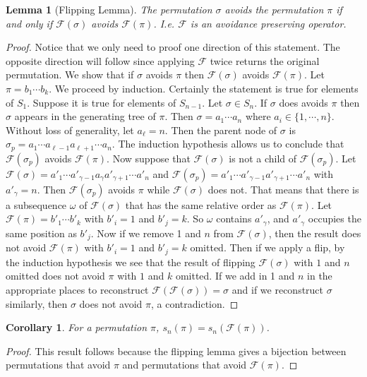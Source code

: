 \documentclass[11pt,letterpaper,twoside,english]{article}
\theoremstyle{theorem}
\newtheorem{corollary}[theorem]{Corollary}
\newtheorem{lemma}[theorem]{Lemma}
\theoremstyle{remark}
\begin{document}
\begin{lemma}[Flipping Lemma]
The permutation $\sigma$ avoids the permutation $\pi$ if and only if $\mathcal{F}(\sigma)$ avoids $\mathcal{F}(\pi)$. I.e. $\mathcal{F}$ is an avoidance preserving operator. 
\end{lemma}
\begin{proof}
Notice that we only need to proof one direction of this statement. The opposite direction will follow since applying $\mathcal{F}$ twice returns the original permutation. We show that if ${\sigma}$ avoids $\pi$ then $\mathcal{F}(\sigma)$ avoids $\mathcal{F}(\pi)$. Let $\pi=b_1\cdots b_k$. We proceed by induction. Certainly the statement is true for elements of $S_1$. Suppose it is true for elements of $S_{n-1}$. Let $\sigma\in S_n$. If ${\sigma}$ does avoids $\pi$ then $\sigma$ appears in the generating tree of $\pi$.  Then $\sigma=a_1\cdots a_n$ where $a_i\in\{1,\cdots, n\}$. Without loss of generality, let $a_\ell=n$. Then the parent node of $\sigma$ is $\sigma_p=a_1\cdots a_{\ell-1} a_{\ell+1}\cdots a_n$. The induction hypothesis allows us to conclude that $\mathcal{F}(\sigma_p)$ avoids $\mathcal{F}(\pi)$. Now suppose that $\mathcal{F}(\sigma)$ is not a child of $\mathcal{F}(\sigma_p)$. Let $\mathcal{F}(\sigma)=a'_1\cdots a'_{\gamma-1} a_{\gamma}a'_{\gamma+1}\cdots a'_n$ and $\mathcal{F}(\sigma_p)=a'_1\cdots a'_{\gamma-1} a'_{\gamma+1}\cdots a'_n$ with $a'_\gamma=n$. Then $\mathcal{F}(\sigma_p)$ avoids $\pi$ while $\mathcal{F}(\sigma)$ does not. That means that there is a subsequence $\omega$ of $\mathcal{F}(\sigma)$ that has the same relative order as $\mathcal{F}(\pi)$. Let $\mathcal{F}(\pi)= b'_1\cdots b'_k$ with $b'_i=1$ and $b'_j=k$. So $\omega$ contains $a'_\gamma$, and $a'_\gamma$ occupies the same position as $b'_j$. Now if we remove 1 and $n$ from $\mathcal{F}(\sigma)$, then the result does not avoid $\mathcal{F}(\pi)$ with $b'_i=1$ and $b'_j=k$ omitted. Then if we apply a flip, by the induction hypothesis we see that the result of flipping $\mathcal{F}(\sigma)$ with $1$ and $n$ omitted does not avoid $\pi$ with $1$ and $k$ omitted. If we add in 1 and $n$ in the appropriate places to reconstruct $\mathcal{F}(\mathcal{F}(\sigma))=\sigma$ and if we reconstruct $\sigma$ similarly, then $\sigma$ does not avoid $\pi$, a contradiction. 
\end{proof}

\begin{corollary} 
For a permutation $\pi$, $s_n(\pi)=s_n(\mathcal{F}(\pi))$. 
\end{corollary}
\begin{proof}
This result follows because the flipping lemma gives a bijection between permutations that avoid $\pi$ and permutations that avoid $\mathcal{F}(\pi)$. 
\end{proof}
\end{document}
